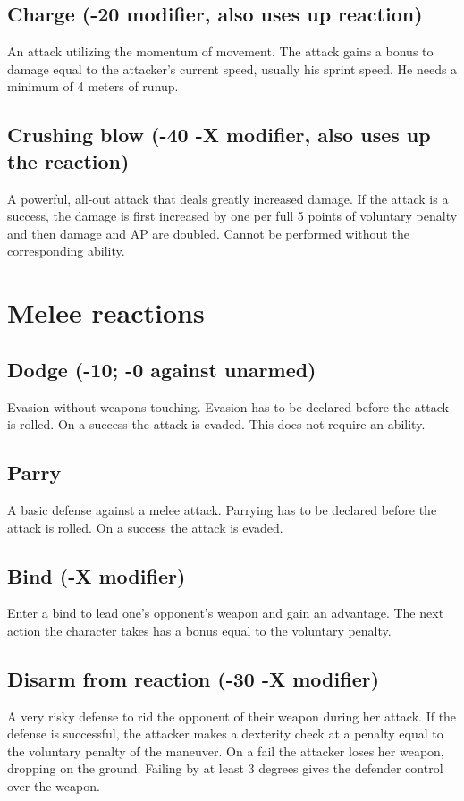 \documentclass[12pt,a4paper]{book}
\begin{document}
	\subsection*{Charge (-20 modifier, also uses up reaction)}
	An attack utilizing the momentum of movement. The attack gains a bonus to damage equal to the attacker’s current speed, usually his sprint speed. He needs a minimum of 4 meters of runup.
	\subsection*{Crushing blow (-40 -X modifier, also uses up the reaction)}
	A powerful, all-out attack that deals greatly increased damage. If the attack is a success, the damage is first increased by one per full 5 points of voluntary penalty and then damage and AP are doubled. Cannot be performed without the corresponding ability.
	\section{Melee reactions}
	\subsection*{Dodge (-10; -0 against unarmed)}
	Evasion without weapons touching. Evasion has to be declared before the attack is rolled. On a success the attack is evaded. This does not require an ability.
	\subsection*{Parry}
	A basic defense against a melee attack. Parrying has to be declared before the attack is rolled. On a success the attack is evaded.
	\subsection*{Bind (-X modifier)}
	Enter a bind to lead one’s opponent’s weapon and gain an advantage. The next action the character takes has a bonus equal to the voluntary penalty.
	\subsection*{Disarm from reaction (-30 -X modifier)}
	A very risky defense to rid the opponent of their weapon during her attack. If the defense is successful, the attacker makes a dexterity check at a penalty equal to the voluntary penalty of the maneuver. On a fail the attacker loses her weapon, dropping on the ground. Failing by at least 3 degrees gives the defender control over the weapon.
\end{document}
